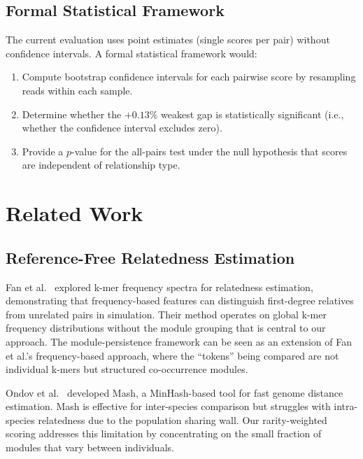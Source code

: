 \documentclass{../yalumba}
\begin{document}
\subsection{Formal Statistical Framework}

The current evaluation uses point estimates (single scores per pair) without
confidence intervals.  A formal statistical framework would:

\begin{enumerate}
  \item Compute bootstrap confidence intervals for each pairwise score by
        resampling reads within each sample.
  \item Determine whether the $+0.13\%$ weakest gap is statistically
        significant (i.e., whether the confidence interval excludes zero).
  \item Provide a $p$-value for the all-pairs test under the null hypothesis
        that scores are independent of relationship type.
\end{enumerate}


\section{Related Work}
\label{sec:related}

\subsection{Reference-Free Relatedness Estimation}

Fan et al.~\cite{fan2021reference} explored k-mer frequency spectra for
relatedness estimation, demonstrating that frequency-based features can
distinguish first-degree relatives from unrelated pairs in simulation.
Their method operates on global k-mer frequency distributions without the
module grouping that is central to our approach.  The module-persistence
framework can be seen as an extension of Fan et al.'s frequency-based
approach, where the ``tokens'' being compared are not individual k-mers but
structured co-occurrence modules.

Ondov et al.~\cite{ondov2016mash} developed Mash, a MinHash-based tool for
fast genome distance estimation.  Mash is effective for inter-species
comparison but struggles with intra-species relatedness due to the population
sharing wall.  Our rarity-weighted scoring addresses this limitation by
concentrating on the small fraction of modules that vary between individuals.
\end{document}
